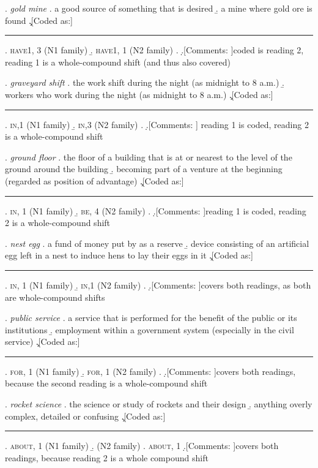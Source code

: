 \ex. \emph{gold mine}
\a. a good source of something that is desired
\b. a mine where gold ore is found
\c.[Coded as:] {\rule{4cm}{0cm}}
\a. \textsc{have1}, 3           (N1 family)
\b. \textsc{have1}, 1 (N2 family)
\z.
\d.[Comments: ]coded is reading 2, reading 1 is a whole-compound shift (and thus also covered)

\ex. \emph{graveyard shift}
\a. the work shift during the night (as midnight to 8 a.m.)
\b. workers who work during the night (as midnight to 8 a.m.)
\c.[Coded as:] {\rule{4cm}{0cm}}
\a. \textsc{in},1 (N1 family)
\b. \textsc{in},3 (N2 family)
\z.
\d.[Comments: ] reading 1 is coded, reading 2 is a whole-compound shift


\ex. \emph{ground floor}
\a. the floor of a building that is at or nearest to the level of the ground around the building
\b. becoming part of a venture at the beginning (regarded as position of advantage)
\c.[Coded as:] {\rule{4cm}{0cm}}
\a. \textsc{in}, 1 (N1 family)
\b. \textsc{be}, 4 (N2 family)
\z.
\d.[Comments: ]reading 1 is coded, reading 2 is a whole-compound shift


\pagebreak[4]
\ex. \emph{nest egg}
\a. a fund of money put by as a reserve
\b. device consisting of an artificial egg left in a nest to induce hens to lay their eggs in it
\c.[Coded as:] {\rule{4cm}{0cm}}
\a. \textsc{in}, 1 (N1 family)
\b. \textsc{in},1 (N2 family)
\z.
\d.[Comments: ]covers both readings, as both are whole-compound shifts


\ex. \emph{public service}
\a. a service that is performed for the benefit of the public or its institutions
\b. employment within a government system (especially in the civil service)
\c.[Coded as:] {\rule{4cm}{0cm}}
\a. \textsc{for}, 1 (N1 family)
\b. \textsc{for}, 1 (N2 family)
\z.
\d.[Comments: ]covers both readings, because the second reading is a whole-compound shift


\ex. \emph{rocket science}
\a. the science or study of rockets and their design
\b. anything overly complex, detailed or confusing
\c.[Coded as:] {\rule{4cm}{0cm}}
\a. \textsc{about}, 1 (N1 family)
\b. (N2 family)
\z. \textsc{about}, 1 
\d.[Comments: ]covers both readings, because reading 2 is a whole compound shift


